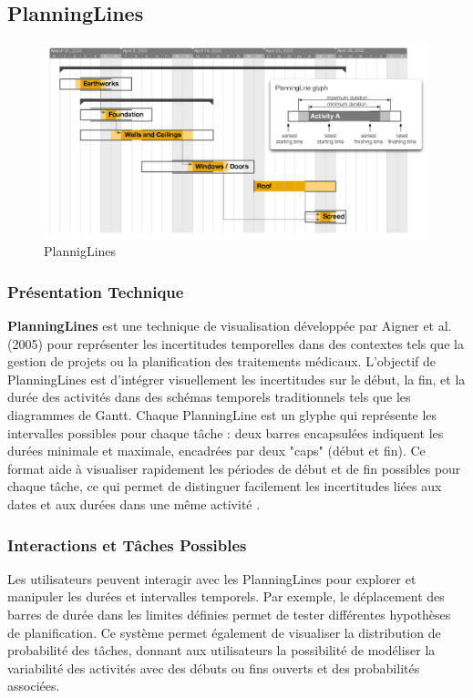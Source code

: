 \documentclass[runningheads]{llncs}
\begin{document}
\subsection{PlanningLines}
\begin{figure}
    \centering
    \includegraphics[width=1\linewidth]{assets/planninglines.png}
    \caption{PlannigLines \cite{aigner_planninglines_2005}}
    \label{fig:enter-label}
\end{figure}
\subsubsection{Présentation Technique}
\textbf{PlanningLines} est une technique de visualisation développée par Aigner et al. (2005) pour représenter les incertitudes temporelles dans des contextes tels que la gestion de projets ou la planification des traitements médicaux. L’objectif de PlanningLines est d’intégrer visuellement les incertitudes sur le début, la fin, et la durée des activités dans des schémas temporels traditionnels tels que les diagrammes de Gantt. Chaque PlanningLine est un glyphe qui représente les intervalles possibles pour chaque tâche : deux barres encapsulées indiquent les durées minimale et maximale, encadrées par deux "caps" (début et fin). Ce format aide à visualiser rapidement les périodes de début et de fin possibles pour chaque tâche, ce qui permet de distinguer facilement les incertitudes liées aux dates et aux durées dans une même activité \cite{aigner_planninglines_2005}.

\subsubsection{Interactions et Tâches Possibles}
Les utilisateurs peuvent interagir avec les PlanningLines pour explorer et manipuler les durées et intervalles temporels. Par exemple, le déplacement des barres de durée dans les limites définies permet de tester différentes hypothèses de planification.  Ce système permet également de visualiser la distribution de probabilité des tâches, donnant aux utilisateurs la possibilité de modéliser la variabilité des activités avec des débuts ou fins ouverts et des probabilités associées.
\end{document}
